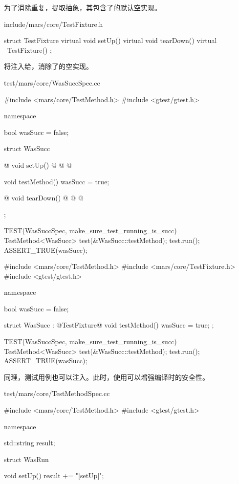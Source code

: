 \begin{content}
为了消除重复，提取抽象，其包含了的默认空实现。

\begin{nodiff}{include/mars/core/TestFixture.h}
\begin{c++}
struct TestFixture {
  virtual void setUp() {}
  virtual void tearDown() {}  
  virtual ~TestFixture() {}
};
\end{c++}
\end{nodiff}

将注入给，消除了的空实现。

\begin{diff}{test/mars/core/WasSuccSpec.cc}
\begin{minicpp}
#include <mars/core/TestMethod.h>
#include <gtest/gtest.h>

namespace {
  bool wasSucc = false;

  struct WasSucc {
@    void setUp() {@
@    }@

    void testMethod() {
      wasSucc = true;
    }

@    void tearDown() {@
@    }@
  };
}

TEST(WasSuccSpec, make_sure_test_running_is_succ) {
  TestMethod<WasSucc> test(&WasSucc::testMethod);
  test.run();
  ASSERT_TRUE(wasSucc);
}
\end{minicpp}
\tcblower
\begin{minicpp}
#include <mars/core/TestMethod.h>
#include <mars/core/TestFixture.h>
#include <gtest/gtest.h>

namespace {
  bool wasSucc = false;

  struct WasSucc : @TestFixture@ {
    void testMethod() {
      wasSucc = true;
    }
  };
}

TEST(WasSuccSpec, make_sure_test_running_is_succ) {
  TestMethod<WasSucc> test(&WasSucc::testMethod);
  test.run();
  ASSERT_TRUE(wasSucc);
}
\end{minicpp}
\end{diff}

同理，测试用例也可以注入。此时，使用可以增强编译时的安全性。

\begin{diff}{test/mars/core/TestMethodSpec.cc}
\begin{minicpp}
#include <mars/core/TestMethod.h>
#include <gtest/gtest.h>

namespace {
  std::string result;

  struct WasRun {
    void setUp() {
      result += "[setUp]";
    }

}}
\end{minicpp}
\end{diff}
\end{content}
